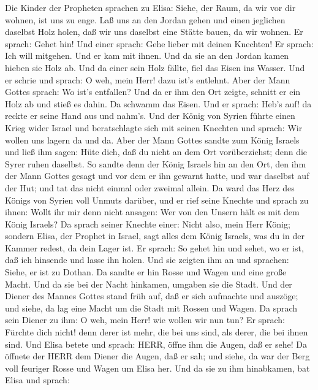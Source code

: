  Die Kinder der Propheten sprachen zu Elisa: Siehe, der
Raum, da wir vor dir wohnen, ist uns zu enge.  Laß uns an
den Jordan gehen und einen jeglichen daselbst Holz holen, daß wir uns
daselbst eine Stätte bauen, da wir wohnen. Er sprach: Gehet hin!
 Und einer sprach: Gehe lieber mit deinen Knechten! Er
sprach: Ich will mitgehen.  Und er kam mit ihnen. Und da sie
an den Jordan kamen hieben sie Holz ab.  Und da einer sein
Holz fällte, fiel das Eisen ins Wasser. Und er schrie und sprach: O weh,
mein Herr! dazu ist's entlehnt.  Aber der Mann Gottes
sprach: Wo ist's entfallen? Und da er ihm den Ort zeigte, schnitt er ein
Holz ab und stieß es dahin. Da schwamm das Eisen.  Und er
sprach: Heb's auf! da reckte er seine Hand aus und nahm's. 
Und der König von Syrien führte einen Krieg wider Israel und
beratschlagte sich mit seinen Knechten und sprach: Wir wollen uns lagern
da und da.  Aber der Mann Gottes sandte zum König Israels
und ließ ihm sagen: Hüte dich, daß du nicht an dem Ort vorüberziehst;
denn die Syrer ruhen daselbst.  So sandte denn der König
Israels hin an den Ort, den ihm der Mann Gottes gesagt und vor dem er
ihn gewarnt hatte, und war daselbst auf der Hut; und tat das nicht
einmal oder zweimal allein.  Da ward das Herz des Königs
von Syrien voll Unmuts darüber, und er rief seine Knechte und sprach zu
ihnen: Wollt ihr mir denn nicht ansagen: Wer von den Unsern hält es mit
dem König Israels?  Da sprach seiner Knechte einer: Nicht
also, mein Herr König; sondern Elisa, der Prophet in Israel, sagt alles
dem König Israels, was du in der Kammer redest, da dein Lager ist.
 Er sprach: So gehet hin und sehet, wo er ist, daß ich
hinsende und lasse ihn holen. Und sie zeigten ihm an und sprachen:
Siehe, er ist zu Dothan.  Da sandte er hin Rosse und Wagen
und eine große Macht. Und da sie bei der Nacht hinkamen, umgaben sie die
Stadt.  Und der Diener des Mannes Gottes stand früh auf,
daß er sich aufmachte und auszöge; und siehe, da lag eine Macht um die
Stadt mit Rossen und Wagen. Da sprach sein Diener zu ihm: O weh, mein
Herr! wie wollen wir nun tun?  Er sprach: Fürchte dich
nicht! denn derer ist mehr, die bei uns sind, als derer, die bei ihnen
sind.  Und Elisa betete und sprach: HERR, öffne ihm die
Augen, daß er sehe! Da öffnete der HERR dem Diener die Augen, daß er
sah; und siehe, da war der Berg voll feuriger Rosse und Wagen um Elisa
her.  Und da sie zu ihm hinabkamen, bat Elisa und sprach:
